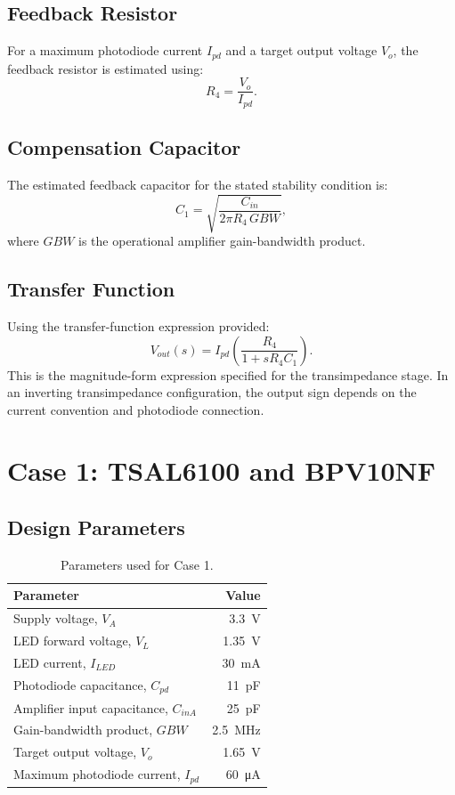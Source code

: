 \documentclass[12pt,a4paper]{article}
\begin{document}
\subsection{Feedback Resistor}
For a maximum photodiode current $I_{pd}$ and a target output voltage $V_o$,
the feedback resistor is estimated using:
\begin{equation}
  R_4 = \frac{V_o}{I_{pd}}.
  \label{eq:rf}
\end{equation}

\subsection{Compensation Capacitor}
The estimated feedback capacitor for the stated stability condition is:
\begin{equation}
  C_1 = \sqrt{\frac{C_{in}}{2\pi R_4\,GBW}},
  \label{eq:cf}
\end{equation}
where $GBW$ is the operational amplifier gain-bandwidth product.

\subsection{Transfer Function}
Using the transfer-function expression provided:
\begin{equation}
  V_{out}(s) =
  I_{pd}\left(\frac{R_4}{1+sR_4C_1}\right).
  \label{eq:transfer}
\end{equation}
This is the magnitude-form expression specified for the transimpedance
stage. In an inverting transimpedance configuration, the output sign depends
on the current convention and photodiode connection.

\section{Case 1: TSAL6100 and BPV10NF}

\subsection{Design Parameters}
\begin{table}[h!]
\centering
\begin{tabular}{>{\raggedright\arraybackslash}p{7cm}r}
\toprule
Parameter & Value \\
\midrule
Supply voltage, $V_A$ & \SI{3.3}{\volt}\\
LED forward voltage, $V_L$ & \SI{1.35}{\volt}\\
LED current, $I_{LED}$ & \SI{30}{\milli\ampere}\\
Photodiode capacitance, $C_{pd}$ & \SI{11}{\pico\farad}\\
Amplifier input capacitance, $C_{inA}$ & \SI{25}{\pico\farad}\\
Gain-bandwidth product, $GBW$ & \SI{2.5}{\mega\hertz}\\
Target output voltage, $V_o$ & \SI{1.65}{\volt}\\
Maximum photodiode current, $I_{pd}$ & \SI{60}{\micro\ampere}\\
\bottomrule
\end{tabular}
\caption{Parameters used for Case 1.}
\end{table}
\end{document}

